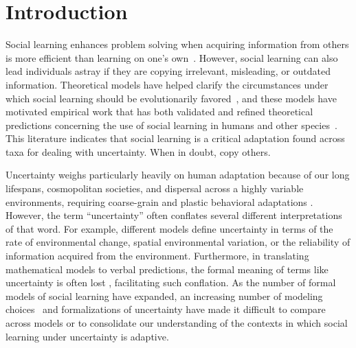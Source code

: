 \documentclass[letterpaper,11.5pt]{scrartcl}
\begin{document}
\section{Introduction}

Social learning enhances problem solving when acquiring information from others is more
efficient than learning on one's own~\cite{Laland2004}. However, social learning can also
lead individuals astray if they are copying irrelevant, misleading, or outdated information.
Theoretical models have helped clarify the circumstances under which social learning
should be evolutionarily favored~\cite{BoydRicherson1985, aoki2014evolution,Kendal2018}, and these models have motivated empirical work that has both validated and refined theoretical predictions concerning the use of social learning in humans
and other species~\cite{galef2005social,McElreath2005,Kendal2018,Allen2019}.  This literature
indicates that social learning is a critical adaptation found across taxa for dealing
with uncertainty. When in doubt, copy others.  

Uncertainty weighs particularly heavily on human adaptation because of
our long lifespans, cosmopolitan societies, and dispersal across a highly variable environments, requiring coarse-grain and plastic behavioral adaptations \cite{levins1962}. However, the term ``uncertainty''
often conflates several different interpretations of that word. For example, different
models define uncertainty in terms of the rate of environmental change, spatial
environmental variation, or the reliability of information acquired from the environment.
Furthermore, in translating mathematical models to verbal predictions, the formal meaning
of terms like uncertainty is often lost \cite{knight1921, lawson1988probability, volz2012}, facilitating such
conflation. %
As the number of formal models of social learning have expanded, an increasing number of modeling choices~\cite{Kendal2018} and formalizations of
uncertainty have made it difficult to compare across models or to consolidate our
understanding of the contexts in which social learning under uncertainty is adaptive. 
\end{document}

